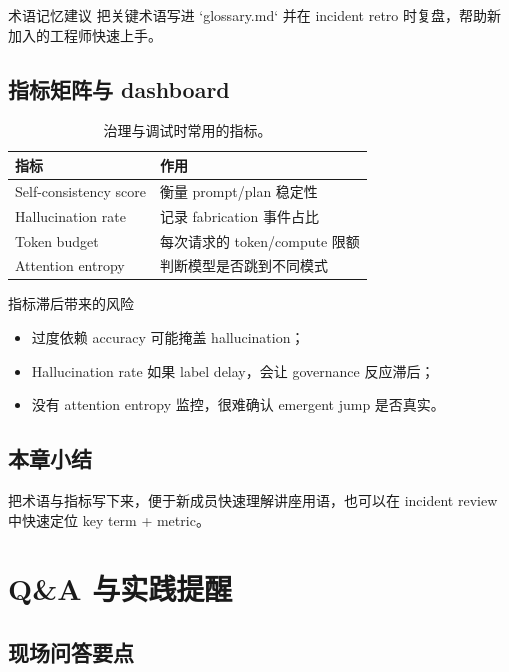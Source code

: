 \documentclass[a4paper]{article}
\begin{document}
\begin{knowledgebox}{术语记忆建议}
把关键术语写进 `glossary.md` 并在 incident retro 时复盘，帮助新加入的工程师快速上手。
\end{knowledgebox}

\subsection{指标矩阵与 dashboard}

\begin{table}[H]
\centering
\begin{tabular}{p{4cm}p{5cm}}
\toprule
指标 & 作用 \\
\midrule
Self-consistency score & 衡量 prompt/plan 稳定性 \\
Hallucination rate & 记录 fabrication 事件占比 \\
Token budget & 每次请求的 token/compute 限额 \\
Attention entropy & 判断模型是否跳到不同模式 \\
\bottomrule
\end{tabular}
\caption{治理与调试时常用的指标。}
\end{table}

\begin{warningbox}{指标滞后带来的风险}
\begin{itemize}
    \item 过度依赖 accuracy 可能掩盖 hallucination；
    \item Hallucination rate 如果 label delay，会让 governance 反应滞后；
    \item 没有 attention entropy 监控，很难确认 emergent jump 是否真实。
\end{itemize}
\end{warningbox}

\subsection{本章小结}

把术语与指标写下来，便于新成员快速理解讲座用语，也可以在 incident review 中快速定位 key term + metric。

\section{Q\&A 与实践提醒}

\subsection{现场问答要点}
\end{document}
